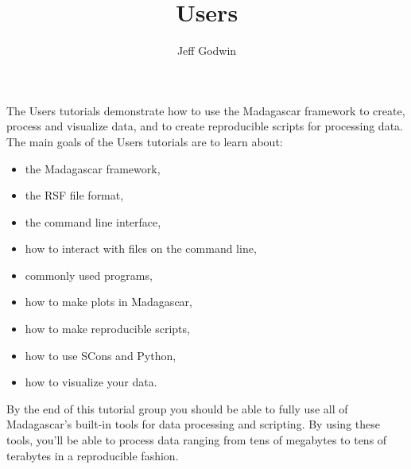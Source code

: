 \title{Users}
\author{Jeff Godwin}
\maketitle

The Users tutorials demonstrate how to use the Madagascar framework to create, process and visualize data, and to create reproducible scripts for processing data.  The main goals of the Users tutorials are to learn about:
\begin{itemize}
    \item the Madagascar framework,
    \item the RSF file format,
    \item the command line interface,
    \item how to interact with files on the command line,
    \item commonly used programs,
    \item how to make plots in Madagascar,
    \item how to make reproducible scripts,
    \item how to use SCons and Python,
    \item how to visualize your data.
\end{itemize}
By the end of this tutorial group you should be able to fully use all of Madagascar's built-in tools for data processing and scripting.  By using these tools, you'll be able to process data ranging from tens of megabytes to tens of terabytes in a reproducible fashion.  







